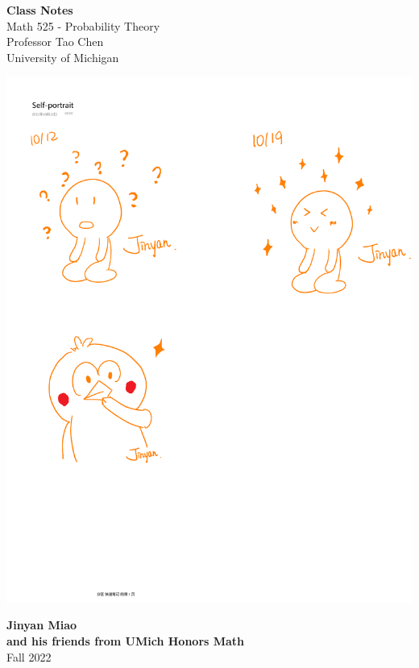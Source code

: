 \documentclass[11pt]{book}
\theoremstyle{break}
\theoremstyle{break}
\begin{document}
	\begin{titlepage}
		\begin{center}
			\vspace*{1cm}
			\Huge \color{red}
				\textbf{Class Notes}\\
			\vspace{0.5cm}			
			\Large \color{black}
				Math 525 - Probability Theory\\
				Professor Tao Chen\\	
				University of Michigan\\
			\vspace{2cm}

			\includegraphics[scale=1.15]{hmm.pdf}
			
			
			\vspace{4cm}
			\LARGE
				\textbf{Jinyan Miao}\\
				\large \textbf{and his friends from UMich Honors Math}\\
				\hfill\break
				\LARGE Fall 2022\\
			\vspace{1cm}

		\vspace*{\fill}
		\end{center}			
	\end{titlepage}
\end{document}
